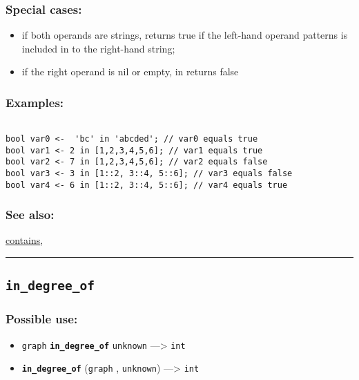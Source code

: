 \documentclass[]{book}
\providecommand{\tightlist}{%
  \setlength{\itemsep}{0pt}\setlength{\parskip}{0pt}}
\theoremstyle{definition}
\theoremstyle{definition}
\theoremstyle{definition}
\theoremstyle{remark}
\begin{document}
\subsubsection{Special cases:}\label{special-cases-77}

\begin{itemize}
\tightlist
\item
  if both operands are strings, returns true if the left-hand operand
  patterns is included in to the right-hand string;\\
\item
  if the right operand is nil or empty, in returns false
\end{itemize}

\subsubsection{Examples:}\label{examples-204}

\begin{verbatim}
 
bool var0 <-  'bc' in 'abcded'; // var0 equals true 
bool var1 <- 2 in [1,2,3,4,5,6]; // var1 equals true 
bool var2 <- 7 in [1,2,3,4,5,6]; // var2 equals false 
bool var3 <- 3 in [1::2, 3::4, 5::6]; // var3 equals false 
bool var4 <- 6 in [1::2, 3::4, 5::6]; // var4 equals true
\end{verbatim}

\subsubsection{See also:}\label{see-also-114}

\href{OperatorsBC\#contains}{contains},

\begin{center}\rule{0.5\linewidth}{\linethickness}\end{center}

\subsection{\texorpdfstring{\texttt{in\_degree\_of}}{in\_degree\_of}}\label{in_degree_of}

\subsubsection{Possible use:}\label{possible-use-267}

\begin{itemize}
\tightlist
\item
  \texttt{graph} \textbf{\texttt{in\_degree\_of}} \texttt{unknown}
  ---\textgreater{} \texttt{int}
\item
  \textbf{\texttt{in\_degree\_of}} (\texttt{graph} , \texttt{unknown})
  ---\textgreater{} \texttt{int}
\end{itemize}
\end{document}
